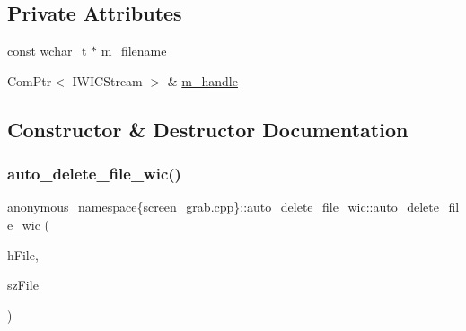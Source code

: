 \subsection*{Private Attributes}
\begin{DoxyCompactItemize}
\item 
const wchar\+\_\+t $\ast$ \mbox{\hyperlink{classanonymous__namespace_02screen__grab_8cpp_03_1_1auto__delete__file__wic_a45ab1fa04a0b6e8ecf9b4a62ab8e8716}{m\+\_\+filename}}
\item 
Com\+Ptr$<$ I\+W\+I\+C\+Stream $>$ \& \mbox{\hyperlink{classanonymous__namespace_02screen__grab_8cpp_03_1_1auto__delete__file__wic_a4660f4a2dcf80c7099b25b181bb21c24}{m\+\_\+handle}}
\end{DoxyCompactItemize}


\subsection{Constructor \& Destructor Documentation}
\mbox{\label{classanonymous__namespace_02screen__grab_8cpp_03_1_1auto__delete__file__wic_a30fc25122da7f1b86d7e3a1d07ce7e89}} 
\subsubsection{\texorpdfstring{auto\+\_\+delete\+\_\+file\+\_\+wic()}{auto\_delete\_file\_wic()}\hspace{0.1cm}{\footnotesize\ttfamily [1/2]}}
{\footnotesize\ttfamily anonymous\+\_\+namespace\{screen\+\_\+grab.\+cpp\}\+::auto\+\_\+delete\+\_\+file\+\_\+wic\+::auto\+\_\+delete\+\_\+file\+\_\+wic (\begin{DoxyParamCaption}\item[{Com\+Ptr$<$ I\+W\+I\+C\+Stream $>$ \&}]{h\+File,  }\item[{const wchar\+\_\+t $\ast$}]{sz\+File }\end{DoxyParamCaption})}

